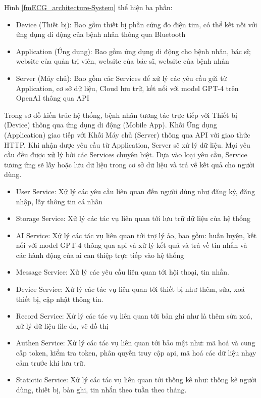 Hình \ref{fmECG_architecture-System} thể hiện ba phần: 

\begin{adjustwidth}{1.5em}{}
\begin{itemize}
  \item Device (Thiết bị): Bao gồm thiết bị phần cứng đo điện tim, có thể kết nối với ứng dụng di động của bệnh nhân thông qua Bluetooth 
  \item Application (Ứng dụng): Bao gồm ứng dụng di động cho bệnh nhân, bác sĩ; website của quản trị viên, website của bác sĩ, website của bệnh nhân
  \item Server (Máy chủ): Bao gồm các Services để xử lý các yêu cầu gửi từ Application, cơ sở dữ liệu, Cloud lưu trữ, kết nối với model GPT-4 trên OpenAI thông qua API
\end{itemize}
\end{adjustwidth}

Trong sơ đồ kiến trúc hệ thống, bệnh nhân tương tác trực tiếp với Thiết bị (Device) thông qua ứng dụng di động (Mobile App). Khối Ứng dụng (Application) giao tiếp với Khối Máy chủ (Server) thông qua API với giao thức HTTP. 
Khi nhận được yêu cầu từ Application, Server sẽ xử lý dữ liệu. Mọi yêu cầu đều được xử lý bởi các Services chuyên biệt. Dựa vào loại yêu cầu, Service tương ứng sẽ lấy hoặc lưu dữ liệu trong cơ sở dữ liệu và trả về kết quả cho người dùng.\begin{adjustwidth}{1.5em}{}
\begin{itemize}
  \item User Service: Xử lý các yêu cầu liên quan đến người dùng như đăng ký, đăng nhập, lấy thông tin cá nhân
  \item Storage Service: Xử lý các tác vụ liên quan tới lưu trữ dữ liệu của hệ thống
  \item AI Service: Xử lý các tác vụ liên quan tới trợ lý ảo, bao gồm: huấn luyện, kết nối với model GPT-4 thông qua api và xử lý kết quả 
  và trả về tin nhắn và các hành động của ai can thiệp trực tiếp vào hệ thống 
  \item Message Service: Xử lý các yêu cầu liên quan tới hội thoại, tin nhắn.
  \item Device Service: Xử lý các tác vụ liên quan tới thiết bị như thêm, sửa, xoá thiết bị, cập nhật thông tin.
  \item Record Service: Xử lý các tác vụ liên quan tới bản ghi như là thêm sửa xoá, xử lý dữ liệu file đo, vẽ đồ thị
  \item Authen Service: Xử lý các tác vụ liên quan tới bảo mật như: mã hoá và cung cấp token, kiểm tra token, phân quyền truy cập api, mã hoá các dữ liệu nhạy cảm trước khi lưu trữ.
  \item Statictic Service: Xử lý các tác vụ liên quan tới thống kê như: thống kê người dùng, thiết bị, bản ghi, tin nhắn theo tuần theo tháng.
\end{itemize}
\end{adjustwidth}

